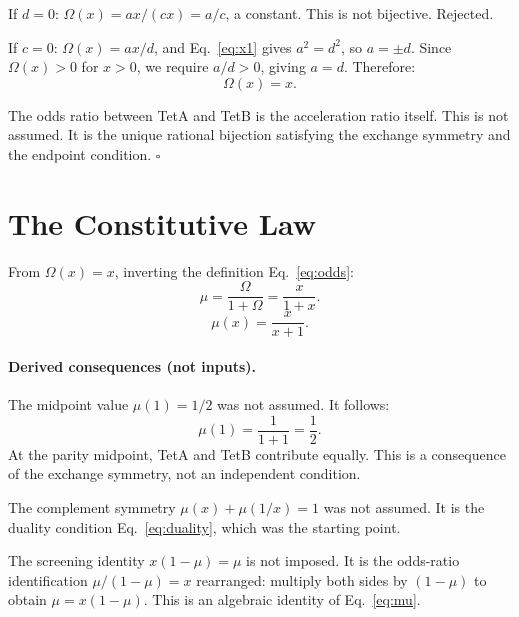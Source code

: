 \documentclass[twocolumn]{iopjournal}
\begin{document}
If $d = 0$: $\Omega(x) = ax/(cx) = a/c$, a constant. This is
not bijective. Rejected.

If $c = 0$: $\Omega(x) = ax/d$, and Eq.~\eqref{eq:x1} gives
$a^2 = d^2$, so $a = \pm d$. Since $\Omega(x) > 0$ for $x > 0$,
we require $a/d > 0$, giving $a = d$. Therefore:
\begin{equation}
  \boxed{\Omega(x) = x.}
  \label{eq:odds_result}
\end{equation}

The odds ratio between TetA and TetB is the acceleration ratio
itself. This is not assumed. It is the unique rational bijection
satisfying the exchange symmetry and the endpoint condition.
\hfill $\square$


\section*{The Constitutive Law}

From $\Omega(x) = x$, inverting the definition
Eq.~\eqref{eq:odds}:
\begin{equation}
  \mu = \frac{\Omega}{1 + \Omega} = \frac{x}{1 + x}.
  \label{eq:mu}
\end{equation}
\begin{equation}
  \boxed{\mu(x) = \frac{x}{x + 1}.}
\end{equation}

\paragraph{Derived consequences (not inputs).}
The midpoint value $\mu(1) = 1/2$ was not assumed. It follows:
\begin{equation*}
  \mu(1) = \frac{1}{1 + 1} = \frac{1}{2}.
\end{equation*}
At the parity midpoint, TetA and TetB contribute equally. This
is a consequence of the exchange symmetry, not an independent
condition.

The complement symmetry $\mu(x) + \mu(1/x) = 1$ was not
assumed. It is the duality condition Eq.~\eqref{eq:duality},
which was the starting point.

The screening identity $x(1 - \mu) = \mu$ is not imposed. It
is the odds-ratio identification $\mu/(1-\mu) = x$ rearranged:
multiply both sides by $(1-\mu)$ to obtain $\mu = x(1-\mu)$.
This is an algebraic identity of Eq.~\eqref{eq:mu}.
\end{document}
